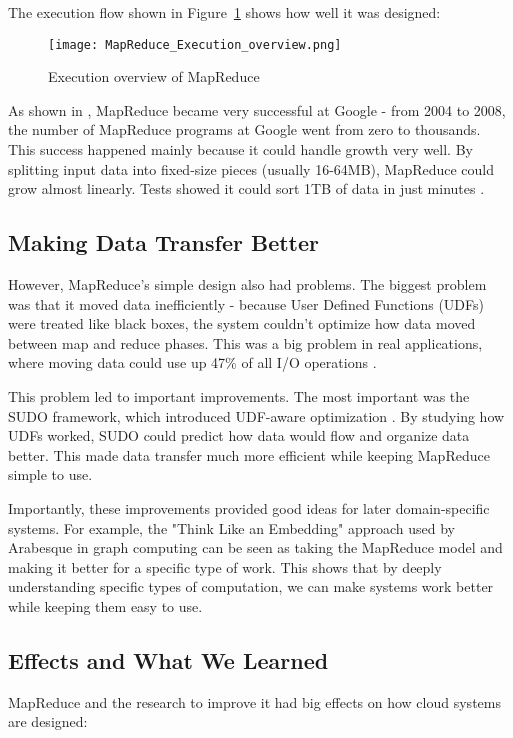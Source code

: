 \documentclass[12pt]{article}
\begin{document}
The execution flow shown in Figure~\ref{fig:mr_flow} shows how well it was designed:

\begin{figure}
    \centering
    \texttt{[image: MapReduce\_Execution\_overview.png]}
    \caption{Execution overview of MapReduce}
    \label{fig:mr_flow}
\end{figure}

As shown in \cite{dean2008mapreduce}, MapReduce became very successful at Google - from 2004 to 2008, the number of MapReduce programs at Google went from zero to thousands. This success happened mainly because it could handle growth very well. By splitting input data into fixed-size pieces (usually 16-64MB), MapReduce could grow almost linearly. Tests showed it could sort 1TB of data in just minutes \cite{dean2008mapreduce}.

\subsection{Making Data Transfer Better}
However, MapReduce's simple design also had problems. The biggest problem was that it moved data inefficiently - because User Defined Functions (UDFs) were treated like black boxes, the system couldn't optimize how data moved between map and reduce phases. This was a big problem in real applications, where moving data could use up 47\% of all I/O operations \cite{olston2008pig}.

This problem led to important improvements. The most important was the SUDO framework, which introduced UDF-aware optimization \cite{jahani2011optimization}. By studying how UDFs worked, SUDO could predict how data would flow and organize data better. This made data transfer much more efficient while keeping MapReduce simple to use.

Importantly, these improvements provided good ideas for later domain-specific systems. For example, the "Think Like an Embedding" approach used by Arabesque \cite{teixeira2015arabesque} in graph computing can be seen as taking the MapReduce model and making it better for a specific type of work. This shows that by deeply understanding specific types of computation, we can make systems work better while keeping them easy to use.

\subsection{Effects and What We Learned}
MapReduce and the research to improve it had big effects on how cloud systems are designed:
\end{document}

